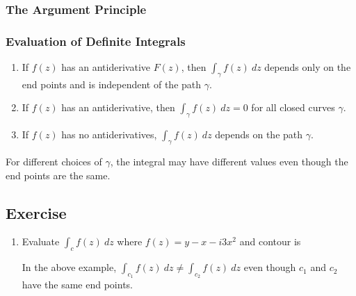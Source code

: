 \subsubsection{The Argument Principle}
\subsubsection{Evaluation of Definite Integrals}





\begin{enumerate}
	\item If $f(z)$ has an antiderivative $F(z)$, then $\int_\gamma f(z)\ dz$ depends only on the end points and is independent of the path $\gamma$.
	\item If $f(z)$ has an antiderivative, then $\int_\gamma f(z)\ dz = 0$ for all closed curves $\gamma$.
	\item If $f(z)$ has no antiderivatives, $\int_\gamma f(z)\ dz$ depends on the path $\gamma$.
\end{enumerate}

	For different choices of $\gamma$, the integral may have different values even though the end points are the same.

\subsection{Exercise}
\begin{enumerate}
\item Evaluate $\int_c f(z)\ dz$ where $f(z) = y-x-i3x^2$ and contour is
	In the above example, $\int_{c_1} f(z)\ dz \ne \int_{c_2}f(z)\ dz$ even though $c_1$ and $c_2$ have the same end points.
\end{enumerate}
